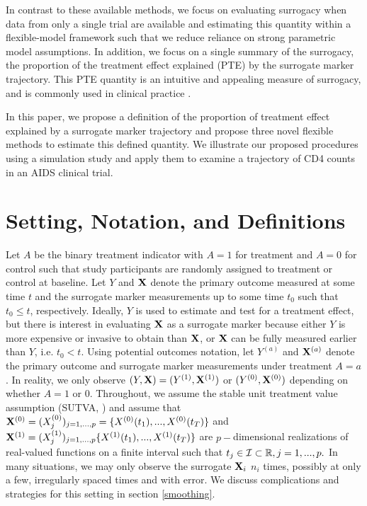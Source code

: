 \documentclass[useAMS,usenatbib,referee]{biom}
\def\Isc{{\cal I}}
\begin{document}
In contrast to these available methods, we focus on evaluating surrogacy when data from only a single trial are available and estimating this quantity within a flexible-model framework such that we reduce reliance on strong parametric model assumptions. In addition, we focus on a single summary of the surrogacy, the proportion of the treatment effect explained (PTE) by the surrogate marker trajectory. This PTE quantity is an intuitive and appealing measure of surrogacy, and is commonly used in clinical practice \citep{inker2016early,agyemang2018herpes,royce2017surrogate,chen2003proportion}. 

In this paper, we propose a definition of the proportion of treatment effect explained by a surrogate marker trajectory and propose three novel flexible methods to estimate this defined quantity. We illustrate our proposed procedures using a simulation study and apply them to examine a trajectory of CD4 counts in an AIDS clinical trial.

\section{Setting, Notation, and Definitions}\label{sec:1}

Let $A$ be the binary treatment indicator with $A=1$ for treatment and $A=0$ for control such that study participants are randomly assigned to treatment or control at baseline.  Let $Y$ and ${\bf X}$ denote the primary outcome measured at some time $t$ and the surrogate marker measurements up to some time $t_0$ such that $t_0 \leq t$, respectively. Ideally, $Y$ is used to estimate and test for a treatment effect, but there is interest in evaluating ${\bf X}$ as a surrogate marker because either $Y$ is more expensive or invasive to obtain than ${\bf X}$, or ${\bf X}$ can be fully measured earlier than $Y$, i.e. $t_0 < t$. Using potential outcomes notation, let $Y^{(a)}$ and ${\bf X}^{(a)}$ denote the primary outcome and surrogate marker measurements under treatment $A = a$. In reality, we only observe $(Y, {\bf X})=(Y^{(1)}, {\bf X}^{(1)})$ or $(Y^{(0)}, {\bf X}^{(0)})$ depending on whether $A=1$ or $0.$ Throughout, we assume the stable unit treatment value assumption (SUTVA, \citet{rosenbaum1983central}) and assume that ${\bf X}^{(0)} = (X^{(0)}_j)_{j=1,...,p} = \{X^{(0)}(t_1), ..., X^{(0)}(t_T)\}$ and ${\bf X}^{(1)} = (X^{(1)}_j)_{j=1,...,p} \{X^{(1)}(t_1), ..., X^{(1)}(t_T)\}$ are $p-$dimensional realizations of real-valued functions on a finite interval such that $t_j \in \Isc \subset \mathbb{R}, j = 1, ..., p.$ In many situations, we may only observe the surrogate ${\bf X}_i$ \(n_i\)
times, possibly at only a few, irregularly spaced times and with error. We discuss complications and strategies for this setting in section \ref{smoothing}.
\end{document}
